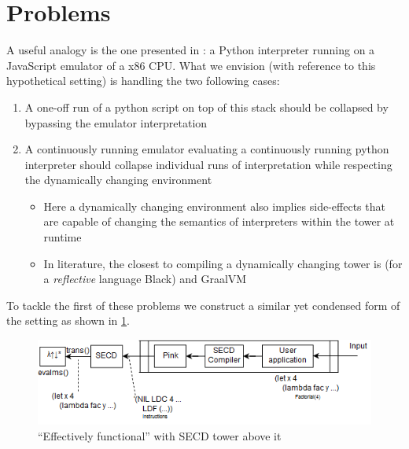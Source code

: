 \documentclass{article}
\begin{document}
\section{Problems}
A useful analogy is the one presented in \cite{amin2017collapsing}: a Python interpreter running on a JavaScript emulator of a x86 CPU. What we envision (with reference to this hypothetical setting) is handling the two following cases:
\begin{enumerate}
	\item A one-off run of a python script on top of this stack should be collapsed by bypassing the emulator interpretation
	\item A continuously running emulator evaluating a continuously running python interpreter should collapse individual runs of interpretation while respecting the dynamically changing environment
	\begin{itemize}
		\item Here a dynamically changing environment also implies side-effects that are capable of changing the semantics of interpreters within the tower at runtime
		\item In literature, the closest to compiling a dynamically changing tower is \cite{asai1997partial, amin2017collapsing} (for a \textit{reflective} language Black) and GraalVM \cite{wurthinger2013one}
	\end{itemize}
\end{enumerate}
To tackle the first of these problems we construct a similar yet condensed form of the setting as shown in \ref{secd_tower_arch}.

\begin{figure}[t]
	\centering
	\includegraphics[scale=0.75]{secd_arch.png}
	\caption{``Effectively functional'' \mslangStar with SECD tower above it}\label{secd_tower_arch}
\end{figure}
\end{document}
